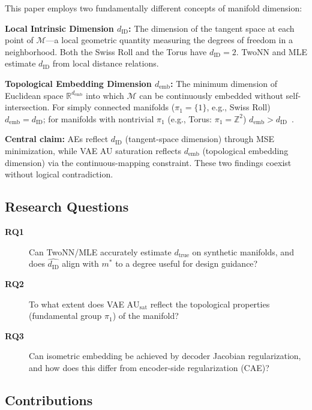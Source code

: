 \documentclass[lettersize,journal]{IEEEtran}
\newcommand{\dID}{d_{\mathrm{ID}}}
\newcommand{\dtrue}{d_{\mathrm{true}}}
\newcommand{\R}{\mathbb{R}}
\newcommand{\AUsat}{\mathrm{AU}_{\mathrm{sat}}}
\newcommand{\demb}{d_{\mathrm{emb}}}
\begin{document}
This paper employs two fundamentally different concepts of manifold dimension:

\textbf{Local Intrinsic Dimension $\dID$:}
The dimension of the tangent space at each point of $\mathcal{M}$---a local geometric quantity measuring the degrees of freedom in a neighborhood.
Both the Swiss Roll and the Torus have $\dID = 2$.
TwoNN and MLE estimate $\dID$ from local distance relations.

\textbf{Topological Embedding Dimension $\demb$:}
The minimum dimension of Euclidean space $\R^{\demb}$ into which $\mathcal{M}$ can be continuously embedded without self-intersection.
For simply connected manifolds ($\pi_1 = \{1\}$, e.g., Swiss Roll) $\demb = \dID$; for manifolds with nontrivial $\pi_1$ (e.g., Torus: $\pi_1 = \mathbb{Z}^2$) $\demb > \dID$~\cite{hatcher2002algebraic,guillemin1974differential}.

\textbf{Central claim:} AEs reflect $\dID$ (tangent-space dimension) through MSE minimization, while VAE AU saturation reflects $\demb$ (topological embedding dimension) via the continuous-mapping constraint.
These two findings coexist without logical contradiction.

\subsection{Research Questions}

\begin{description}
  \item[\textbf{RQ1}] Can TwoNN/MLE accurately estimate $\dtrue$ on synthetic manifolds, and does $\hat{\dID}$ align with $m^*$ to a degree useful for design guidance?
  \item[\textbf{RQ2}] To what extent does VAE $\AUsat$ reflect the topological properties (fundamental group $\pi_1$) of the manifold?
  \item[\textbf{RQ3}] Can isometric embedding be achieved by decoder Jacobian regularization, and how does this differ from encoder-side regularization (CAE)?
\end{description}

\subsection{Contributions}
\end{document}
